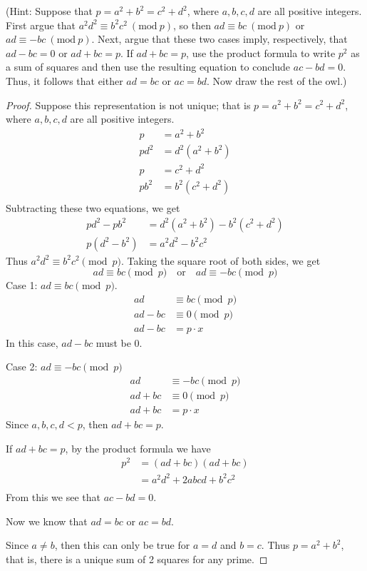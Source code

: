 \documentclass[11pt]{article}
\theoremstyle{definition}
\newcommand{\Mod}[1]{\ (\mathrm{mod}\ #1)}
\begin{document}
\begin{enumerate}
    (Hint: Suppose that $p = a^2 + b^2 = c^2 + d^2$, where $a,b,c,d$ are all positive integers. First argue that $a^2d^2 \equiv b^2 c^2 \Mod p$, so then $ad \equiv bc \Mod p$ or $ad \equiv -bc \Mod p$. Next, argue that these two cases imply, respectively, that $ad - bc = 0$ or $ad + bc = p$. If $ad + bc = p$, use the product formula to write $p^2$ as a sum of squares and then use the resulting equation to conclude $ac - bd = 0$. Thus, it follows that either $ad = bc$ or $ac = bd$. Now draw the rest of the owl.)
    \begin{proof}
        Suppose this representation is not unique; that is $p = a^2 + b^2 = c^2 + d^2$, 
        where $a,b,c,d$ are all positive integers. 
        \begin{align*}
            p &= a^2 + b^2 \\
            pd^2 &= d^2(a^2+b^2) \\
            p &= c^2 + d^2 \\
            pb^2 &= b^2(c^2 + d^2) \\
        \end{align*}
        Subtracting these two equations, we get
        \begin{align*}
            pd^2 - pb^2 &= d^2(a^2+b^2) - b^2(c^2 + d^2) \\
            p(d^2 - b^2) &= a^2d^2 - b^2c^2
        \end{align*}
        Thus $a^2d^2 \equiv b^2c^2 \pmod{p}$. Taking the square root of both sides, we get 
        \[
            ad\equiv bc\pmod{p} \quad\text{or}\quad ad\equiv -bc\pmod{p}
        \]
        Case 1: $ad\equiv bc\pmod{p}$.
        \begin{align*}
            ad &\equiv bc\pmod{p} \\
            ad - bc &\equiv 0\pmod{p} \\
            ad - bc &= p\cdot x
        \end{align*}
        In this case, $ad-bc$ must be 0.

        Case 2: $ad\equiv -bc\pmod{p}$
        \begin{align*}
            ad &\equiv -bc\pmod{p} \\
            ad + bc &\equiv 0\pmod{p} \\
            ad + bc &= p\cdot x 
        \end{align*}
        Since $a,b,c,d<p$, then $ad+bc = p$. 

        If $ad + bc = p$, by the product formula we have
        \begin{align*}
            p^2 &= (ad+bc)(ad+bc) \\
            &= a^2d^2 + 2abcd + b^2c^2 \\
        \end{align*}
        From this we see that $ac-bd = 0$.

        Now we know that $ad = bc$ or $ac = bd$. 
        
        Since $a\ne b$,
        then this can only be true for $a=d$ and $b=c$. 
        Thus $p=a^2+b^2$, that is, there is a unique sum of 2 squares for any prime.
    \end{proof}

\end{enumerate}
\end{document}
